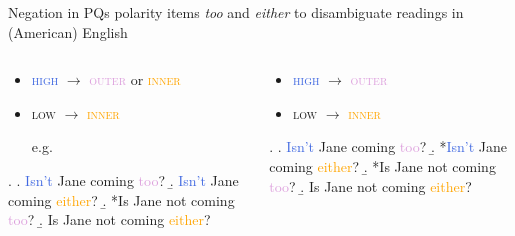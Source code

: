 \documentclass[xcolor=dvipsnames]{beamer}
\begin{document}
\begin{frame}{Negation in PQs}
    polarity items \textit{too} and \textit{either} to disambiguate readings in (American) English 
    \begin{columns}
        \begin{column}{0.5\textwidth}
            \begin{itemize}
                \item \textcolor{RoyalBlue}{\textsc{high}} $\rightarrow$ 
                \textcolor{Plum}{\textsc{outer}} or \textcolor{Orange}{\textsc{inner}}
                \item \textcolor{WildStrawberry}{\textsc{low}} $\rightarrow$ \textcolor{Orange}{\textsc{inner}} \\
                \begin{scriptsize}
                    e.g. \cite{romero-han04}           
                \end{scriptsize}
            \end{itemize}
                \begin{small}
                    \ex. \a. \textcolor{RoyalBlue}{Isn't} Jane coming \textcolor{Plum}{too}? 
                    \b. \textcolor{RoyalBlue}{Isn't} Jane coming \textcolor{Orange}{either}?
                    \b. *Is Jane \textcolor{WildStrawberry}{not} coming \textcolor{Plum}{too}? 
                    \b. Is Jane \textcolor{WildStrawberry}{not} coming \textcolor{Orange}{either}? 
                    \par
                \end{small}
        \end{column}

        \begin{column}{0.5\textwidth}
            \begin{itemize}
                \item \textcolor{RoyalBlue}{\textsc{high}} $\rightarrow$ \textcolor{Plum}{\textsc{outer}}
                \item \textcolor{WildStrawberry}{\textsc{low}} $\rightarrow$ \textcolor{Orange}{\textsc{inner}} \\
                \begin{scriptsize}
                    \cite{AnderBois2019, Goodhue2022a}           
                \end{scriptsize}
            \end{itemize}
            \begin{small}
                \ex. \a. \textcolor{RoyalBlue}{Isn't} Jane coming \textcolor{Plum}{too}? 
                \b. *\textcolor{RoyalBlue}{Isn't} Jane coming \textcolor{Orange}{either}?
                \b. *Is Jane \textcolor{WildStrawberry}{not} coming \textcolor{Plum}{too}? 
                \b. Is Jane \textcolor{WildStrawberry}{not} coming \textcolor{Orange}{either}? 
                \par
            \end{small}
        \end{column}
    \end{columns}

\end{frame}
\end{document}
